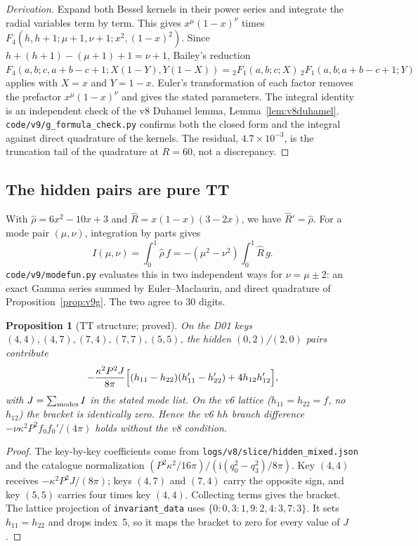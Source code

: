 \documentclass[11pt,a4paper]{article}
\newcommand{\ii}{\mathrm i}
\newcommand{\loc}[1]{\nolinkurl{#1}}
\theoremstyle{plain}
\newtheorem{proposition}[theorem]{Proposition}
\theoremstyle{definition}
\theoremstyle{remark}
\numberwithin{equation}{section}
\begin{document}
\begin{proof}[Derivation]
Expand both Bessel kernels in their power series and integrate the
radial variables term by term. This gives
\(x^\mu(1-x)^\nu\) times
\(F_4(h,h+1;\mu+1,\nu+1;x^2,(1-x)^2)\). Since
\(h+(h+1)-(\mu+1)+1=\nu+1\), Bailey's reduction
\(F_4(a,b;c,a+b-c+1;X(1-Y),Y(1-X))={}_2F_1(a,b;c;X)\,{}_2F_1(a,b;a+b-c+1;Y)\)
applies with \(X=x\) and \(Y=1-x\). Euler's transformation of each
factor removes the prefactor \(x^\mu(1-x)^\nu\) and gives the
stated parameters. The integral identity is an independent check
of the v8 Duhamel lemma, Lemma~\ref{lem:v8duhamel}.
\loc{code/v9/g_formula_check.py} confirms both the closed form and
the integral against direct quadrature of the kernels. The
residual, \(4.7\times10^{-3}\), is the truncation tail of the
quadrature at \(R=60\), not a discrepancy.
\end{proof}

\subsection{The hidden pairs are pure TT}

With \(\hat\rho=6x^2-10x+3\) and
\(\hat R=x(1-x)(3-2x)\), we have \(\hat R'=\hat\rho\). For a mode
pair \((\mu,\nu)\), integration by parts gives
\[
 I(\mu,\nu)=\int_0^1\hat\rho\,f
 =-(\mu^2-\nu^2)\int_0^1\hat R\,g .
\]
\loc{code/v9/modefun.py} evaluates this in two independent ways
for \(\nu=\mu\pm2\): an exact Gamma series summed by
Euler--Maclaurin, and direct quadrature of
Proposition~\ref{prop:v9g}. The two agree to 30 digits.

\begin{proposition}[TT structure; proved]
\label{prop:v9TT}
On the D01 keys \((4,4),(4,7),(7,4),(7,7),(5,5)\), the hidden
\((0,2)\)/\((2,0)\) pairs contribute
\[
 -\frac{\kappa^2P^2J}{8\pi}\Bigl[(h_{11}-h_{22})(h'_{11}-h'_{22})
 +4h_{12}h'_{12}\Bigr],
\]
with \(J=\sum_{\rm modes}I\) in the stated mode list. On the v6 lattice
(\(h_{11}=h_{22}=f\), no \(h_{12}\)) the bracket is identically zero.
Hence the v6 \(hh\) branch difference
\(-\nu\kappa^2P^2f_0f_0'/(4\pi)\) holds without the v8 condition.
\end{proposition}

\begin{proof}
The key-by-key coefficients come from
\loc{logs/v8/slice/hidden_mixed.json} and the catalogue
normalization
\((P^2\kappa^2/16\pi)/(\ii(q_0^2-q_3^2)/8\pi)\). Key \((4,4)\)
receives \(-\kappa^2P^2J/(8\pi)\); keys \((4,7)\) and \((7,4)\) carry
the opposite sign, and key \((5,5)\) carries four times key
\((4,4)\). Collecting terms gives the bracket. The lattice
projection of \loc{invariant_data} uses
\(\{0{:}0,3{:}1,9{:}2,4{:}3,7{:}3\}\). It sets \(h_{11}=h_{22}\)
and drops index~5, so it maps the bracket to zero for every value
of \(J\).
\end{proof}
\end{document}
